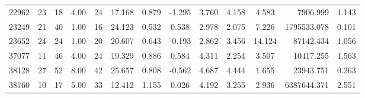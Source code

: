 \documentclass[mnsc]{informs3}
\begin{document}
\begin{APPENDICES}
\begin{longtable}{cccccccccccrc}
22962 & 23 & 18 & 4.00 & 24 & 17.168 & 0.879 & -1.295 & 3.760 & 4.158 & 4.583 & 7906.999 & 1.143 \\
23249 & 21 & 40 & 1.00 & 16 & 24.123 & 0.532 & 0.538 & 2.978 & 2.075 & 7.226 & 1795533.078 & 0.101 \\
23652 & 24 & 24 & 1.00 & 20 & 20.607 & 0.643 & -0.193 & 2.862 & 3.456 & 14.124 & 87142.434 & 1.056 \\
37077 & 11 & 46 & 4.00 & 24 & 19.329 & 0.886 & 0.584 & 4.311 & 2.254 & 3.507 & 10417.255 & 1.563 \\
38128 & 27 & 52 & 8.00 & 42 & 25.657 & 0.808 & -0.562 & 4.687 & 4.444 & 1.655 & 23943.751 & 0.263 \\
38760 & 10 & 17 & 5.00 & 33 & 12.412 & 1.155 & 0.026 & 4.192 & 3.255 & 2.936 & 6387644.371 & 2.551 \\
\bottomrule
\end{longtable}

\end{APPENDICES}










%



\end{document}
